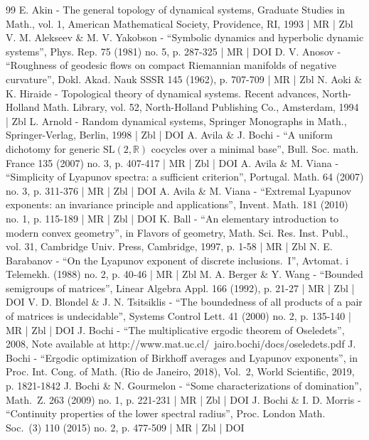 \documentclass[10pt]{amsart}
\theoremstyle{plain}
\theoremstyle{definition}
\begin{document}
\begin{thebibliography}{99}
E. Akin - The general topology of dynamical systems, Graduate Studies in Math., vol. 1, American Mathematical Society, Providence, RI, 1993 | MR | Zbl
V. M. Alekseev \& M. V. Yakobson - “Symbolic dynamics and hyperbolic dynamic systems”, Phys. Rep. 75 (1981) no. 5, p. 287-325 | MR | DOI
D. V. Anosov - “Roughness of geodesic flows on compact Riemannian manifolds of negative curvature”, Dokl. Akad. Nauk SSSR 145 (1962), p. 707-709 | MR | Zbl
N. Aoki \& K. Hiraide - Topological theory of dynamical systems. Recent advances, North-Holland Math. Library, vol. 52, North-Holland Publishing Co., Amsterdam, 1994 | Zbl
L. Arnold - Random dynamical systems, Springer Monographs in Math., Springer-Verlag, Berlin, 1998 | Zbl | DOI
A. Avila \& J. Bochi - “A uniform dichotomy for generic $\mathrm{SL}(2,\mathbb{R})$ cocycles over a minimal base”, Bull. Soc. math. France 135 (2007) no. 3, p. 407-417 | MR | Zbl | DOI
A. Avila \& M. Viana - “Simplicity of Lyapunov spectra: a sufficient criterion”, Portugal. Math. 64 (2007) no. 3, p. 311-376 | MR | Zbl | DOI
A. Avila \& M. Viana - “Extremal Lyapunov exponents: an invariance principle and applications”, Invent. Math. 181 (2010) no. 1, p. 115-189 | MR | Zbl | DOI
K. Ball - “An elementary introduction to modern convex geometry”, in Flavors of geometry, Math. Sci. Res. Inst. Publ., vol. 31, Cambridge Univ. Press, Cambridge, 1997, p. 1-58 | MR | Zbl
N. E. Barabanov - “On the Lyapunov exponent of discrete inclusions. I”, Avtomat. i Telemekh. (1988) no. 2, p. 40-46 | MR | Zbl
M. A. Berger \& Y. Wang - “Bounded semigroups of matrices”, Linear Algebra Appl. 166 (1992), p. 21-27 | MR | Zbl | DOI
V. D. Blondel \& J. N. Tsitsiklis - “The boundedness of all products of a pair of matrices is undecidable”, Systems Control Lett. 41 (2000) no. 2, p. 135-140 | MR | Zbl | DOI
J. Bochi - “The multiplicative ergodic theorem of Oseledets”, 2008, Note available at http://www.mat.uc.cl/~jairo.bochi/docs/oseledets.pdf
J. Bochi - “Ergodic optimization of Birkhoff averages and Lyapunov exponents”, in Proc. Int. Cong. of Math. (Rio de Janeiro, 2018), Vol. 2, World Scientific, 2019, p. 1821-1842
J. Bochi \& N. Gourmelon - “Some characterizations of domination”, Math. Z. 263 (2009) no. 1, p. 221-231 | MR | Zbl | DOI
J. Bochi \& I. D. Morris - “Continuity properties of the lower spectral radius”, Proc. London Math. Soc. (3) 110 (2015) no. 2, p. 477-509 | MR | Zbl | DOI

\end{thebibliography}
\end{document}
